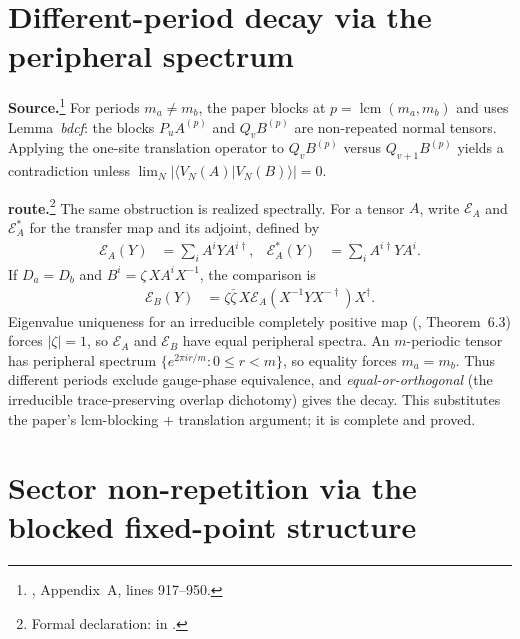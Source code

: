 \documentclass{article}
\begin{document}
\section{Different-period decay via the peripheral spectrum}

\textbf{Source.}\footnote{\cite{DeLasCuevas2017Irreducible}, Appendix~A,
lines 917--950.} For periods $m_a\neq m_b$, the paper blocks at
$p=\operatorname{lcm}(m_a,m_b)$ and uses Lemma~\emph{bdcf}: the blocks
$P_uA^{(p)}$ and $Q_vB^{(p)}$ are non-repeated normal tensors. Applying the
one-site translation operator to $Q_vB^{(p)}$ versus $Q_{v+1}B^{(p)}$ yields a
contradiction unless $\lim_N|\langle V_N(A)|V_N(B)\rangle|=0$.

\textbf{\Lean{} route.}\footnote{Formal declaration:
 in .}
The same obstruction is realized spectrally. For a tensor $A$, write
$\mathcal E_A$ and $\mathcal E_A^*$ for the transfer map and its adjoint,
defined by
\begin{align}
    \mathcal E_A(Y) &= \sum_i A^iYA^{i\dagger},&
    \mathcal E_A^*(Y) &= \sum_i A^{i\dagger}YA^i .
\end{align}
If $D_a=D_b$ and $B^i=\zeta\,XA^iX^{-1}$, the comparison is
\begin{align}
    \mathcal E_B(Y)
        &= \zeta\bar\zeta\,
           X\mathcal E_A(X^{-1}YX^{-\dagger})X^\dagger .
    \tag{Case 1}
\end{align}
Eigenvalue uniqueness for an irreducible completely positive map
(\cite{Wolf2012Quantum}, Theorem~6.3) forces $|\zeta|=1$, so $\mathcal E_A$ and
$\mathcal E_B$ have equal peripheral spectra. An $m$-periodic tensor has
peripheral spectrum $\{e^{2\pi i r/m}:0\le r<m\}$, so equality forces $m_a=m_b$.
Thus different periods exclude gauge-phase equivalence, and
\emph{equal-or-orthogonal} (the irreducible trace-preserving overlap dichotomy)
gives the decay. This substitutes the paper's lcm-blocking + translation
argument; it is complete and proved.

\section{Sector non-repetition via the blocked fixed-point structure}
\end{document}

